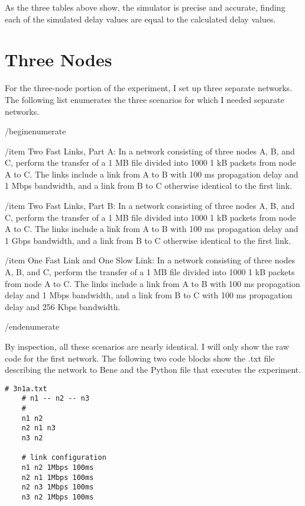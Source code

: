\documentclass[11pt]{article}
\begin{document}
As the three tables above show, the simulator is precise and accurate, finding each of the simulated delay values are equal to the calculated delay values. 

\section{Three Nodes}

For the three-node portion of the experiment, I set up three separate networks. The following list enumerates the three scenarios for which I needed separate networks. 

/begin{enumerate}

/item Two Fast Links, Part A: In a network consisting of three nodes A, B, and C, perform the transfer of a 1 MB file divided into 1000 1 kB packets from node A to C. The links include a link from A to B with 100 ms propagation delay and 1 Mbps bandwidth, and a link from B to C otherwise identical to the first link.

/item Two Fast Links, Part B: In a network consisting of three nodes A, B, and C, perform the transfer of a 1 MB file divided into 1000 1 kB packets from node A to C. The links include a link from A to B with 100 ms propagation delay and 1 Gbps bandwidth, and a link from B to C otherwise identical to the first link.

/item One Fast Link and One Slow Link: In a network consisting of three nodes A, B, and C, perform the transfer of a 1 MB file divided into 1000 1 kB packets from node A to C. The links include a link from A to B with 100 ms propagation delay and 1 Mbps bandwidth, and a link from B to C with 100 ms propagation delay and 256 Kbps bandwidth.

/end{enumerate}

By inspection, all these scenarios are nearly identical. I will only show the raw code for the first network. The following two code blocks show the .txt file describing the network to Bene and the Python file that executes the experiment.

\begin{lstlisting}
# 3n1a.txt
    # n1 -- n2 -- n3
    #
    n1 n2
    n2 n1 n3
    n3 n2

    # link configuration
    n1 n2 1Mbps 100ms
    n2 n1 1Mbps 100ms
    n2 n3 1Mbps 100ms
    n3 n2 1Mbps 100ms
\end{lstlisting}
\end{document}
